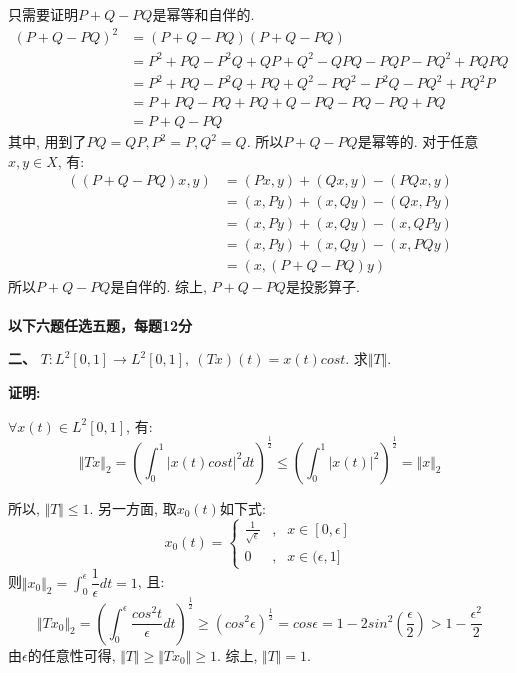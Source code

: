\documentclass{article}
\begin{document}
只需要证明$P+Q-PQ$是幂等和自伴的.
\begin{align*}
(P+Q-PQ)^2 &= (P+Q-PQ)(P+Q-PQ) \\
           &= P^2 + PQ - P^2Q + QP + Q^2 - QPQ - PQP - PQ^2 + PQPQ \\
           &= P^2 + PQ -P^2Q + PQ + Q^2 -PQ^2 -P^2Q - PQ^2 + PQ^2P \\
           &= P + PQ - PQ + PQ + Q - PQ - PQ - PQ + PQ \\
           &= P+Q-PQ
\end{align*}
其中, 用到了$PQ = QP, P^2 = P, Q^2 = Q$. 所以$P+Q-PQ$是幂等的. 对于任意$x,y \in X$, 有:
\begin{align*}
\left((P+Q-PQ)x, y \right) &= (Px, y) + (Qx, y) - (PQx, y) \\
                           &= (x, Py) + (x, Qy) - (Qx, Py) \\
                           &= (x, Py) + (x, Qy) - (x, QPy) \\
                           &= (x, Py) + (x, Qy) - (x, PQy) \\
                           &= \left(x,(P+Q-PQ)y \right)
\end{align*}
所以$P+Q-PQ$是自伴的. 综上, $P+Q-PQ$是投影算子. \\  \\


\textbf{以下六题任选五题，每题12分}

\textbf{二、} $T: L^2[0,1] \rightarrow L^2[0,1], \ (Tx)(t) = x(t)cost$. 求$\Vert T \Vert$. 

\textbf{证明:}

$\forall x(t) \in L^2[0,1]$, 有:
$$ \Vert Tx \Vert_2 = \left(\int_0^1 |x(t)cost|^2 dt  \right)^{\frac{1}{2}} \leq \left( \int_0^1 |x(t)|^2 \right)^{\frac{1}{2}} = \Vert x \Vert_2$$

所以, $\Vert T \Vert \leq 1$. 另一方面, 取$x_0(t)$如下式:
$$ x_0(t) = \left\{
\begin{array}{lcl}
\frac{1}{\sqrt{\epsilon}} & , & x \in[0, \epsilon] \\
0 &, & x \in (\epsilon, 1]
\end{array}
\right.
$$
则$\Vert x_0 \Vert_2 =  \int_0^{\epsilon} \dfrac{1}{\epsilon} dt = 1 $, 且:
$$ \Vert Tx_0 \Vert_2 = \left( \int_0^{\epsilon} \dfrac{cos^2 t}{\epsilon} dt \right)^{\frac{1}{2}} \geq \left( cos^2 \epsilon \right)^{\frac{1}{2}} = cos \epsilon = 1 - 2sin^2(\frac{\epsilon}{2}) > 1 - \frac{\epsilon^2}{2} $$
由$\epsilon$的任意性可得, $\Vert T \Vert \geq \Vert Tx_0 \Vert \geq 1$. 综上, $\Vert T \Vert = 1$. \\  \\
\end{document}
